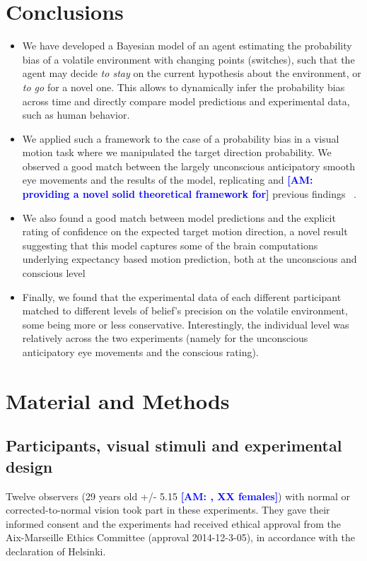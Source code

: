 \documentclass[12pt,english]{article}%
\newcommand{\citep}[1]{\parencite{#1}}
\newcommand{\AM}[1]{\textbf{\textcolor{blue}{[AM: #1]}}}
\begin{document}
\section{Conclusions}
\begin{itemize}\setlength{\itemsep}{0ex}
\item We have developed a Bayesian model of an agent estimating the probability bias of a volatile environment with changing points (switches), such that the agent may decide \textit{to stay} on the current hypothesis about the environment, or \textit{to go} for a novel one. This allows to dynamically infer the probability bias across time and directly compare model predictions and experimental data, such as human behavior.
\item We applied such a framework to the case of a probability bias in a visual motion task where we manipulated the target direction probability. We observed a good match between the largely unconscious anticipatory smooth eye movements and the results of the model, replicating and \AM{providing a novel solid theoretical framework for} previous findings ~\citep{Montagnini2010, SantosKowler2017, Damasse18}.
\item We also found a good match between model predictions and the explicit rating of confidence on the expected target motion direction, a novel result suggesting that this model captures some of the brain computations underlying expectancy based motion prediction, both at the unconscious and conscious level
\item Finally, we found that the experimental data of each different participant matched to different levels of belief's precision on the volatile environment, some being more or less conservative. Interestingly, the individual level was relatively across the two experiments (namely for the unconscious anticipatory eye movements and the conscious rating).
\end{itemize}
\section{Material and Methods}
\subsection{Participants, visual stimuli and experimental design}
Twelve observers (29 years old +/- 5.15 \AM{, XX females}) with normal or corrected-to-normal vision took part in these experiments. They gave their informed consent and the experiments had received ethical approval from the Aix-Marseille Ethics Committee (approval 2014-12-3-05), in accordance with the declaration of Helsinki.
\end{document}
